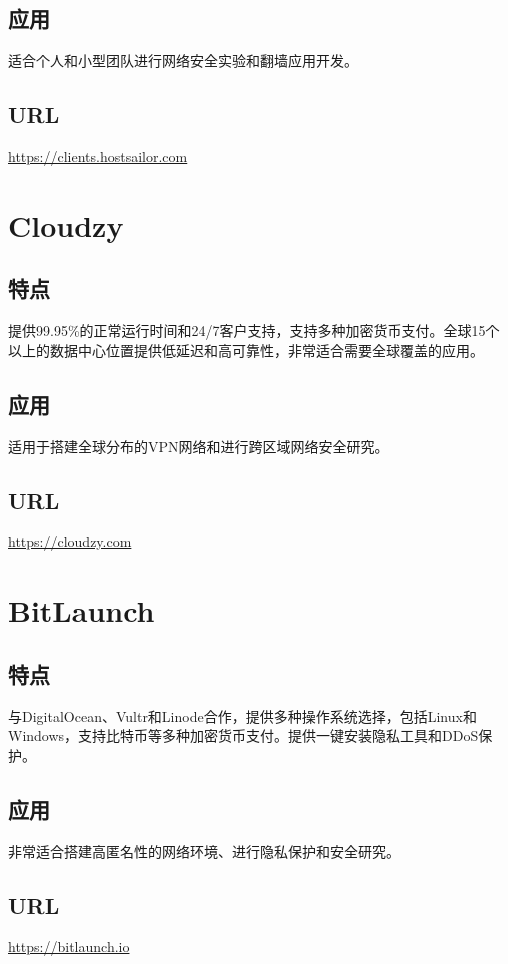 \documentclass[11pt]{article}
\begin{document}
\subsection{应用}
\label{sec:org8865562}
适合个人和小型团队进行网络安全实验和翻墙应用开发。
\subsection{URL}
\label{sec:orgb63ce23}
\url{https://clients.hostsailor.com}

\section{Cloudzy}
\label{sec:orgbffaab9}
\subsection{特点}
\label{sec:orgd930c1a}
提供99.95\%的正常运行时间和24/7客户支持，支持多种加密货币支付。全球15个以上的数据中心位置提供低延迟和高可靠性，非常适合需要全球覆盖的应用。
\subsection{应用}
\label{sec:orgc2f21f1}
适用于搭建全球分布的VPN网络和进行跨区域网络安全研究。
\subsection{URL}
\label{sec:org3948784}
\url{https://cloudzy.com}

\section{BitLaunch}
\label{sec:org5466cd7}
\subsection{特点}
\label{sec:orgffa39f9}
与DigitalOcean、Vultr和Linode合作，提供多种操作系统选择，包括Linux和Windows，支持比特币等多种加密货币支付。提供一键安装隐私工具和DDoS保护。
\subsection{应用}
\label{sec:orgc892cf1}
非常适合搭建高匿名性的网络环境、进行隐私保护和安全研究。
\subsection{URL}
\label{sec:org4b36850}
\url{https://bitlaunch.io}
\end{document}
